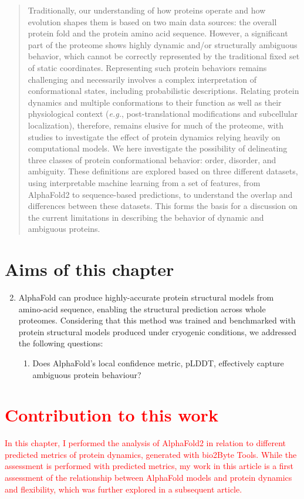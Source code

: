 \begin{abstract}
    Traditionally, our understanding of how proteins operate and how evolution shapes them is based on two main data sources: the overall protein fold and the protein amino acid sequence. However, a significant part of the proteome shows highly dynamic and/or structurally ambiguous behavior, which cannot be correctly represented by the traditional fixed set of static coordinates. Representing such protein behaviors remains challenging and necessarily involves a complex interpretation of conformational states, including probabilistic descriptions. Relating protein dynamics and multiple conformations to their function as well as their physiological context (\textit{e.g.}, post-translational modifications and subcellular localization), therefore, remains elusive for much of the proteome, with studies to investigate the effect of protein dynamics relying heavily on computational models. We here investigate the possibility of delineating three classes of protein conformational behavior: order, disorder, and ambiguity. These definitions are explored based on three different datasets, using interpretable machine learning from a set of features, from AlphaFold2 to sequence-based predictions, to understand the overlap and differences between these datasets. This forms the basis for a discussion on the current limitations in describing the behavior of dynamic and ambiguous proteins.
\end{abstract}

\section*{Aims of this chapter}
\begin{enumerate}
    \setcounter{enumi}{1}
    \item AlphaFold can produce highly-accurate protein structural models from amino-acid sequence, enabling the structural prediction across whole proteomes. Considering that this method was trained and benchmarked with protein structural models produced under cryogenic conditions, we addressed the following questions: 
    \begin{enumerate}
        \item Does AlphaFold's local confidence metric, pLDDT, effectively capture ambiguous protein behaviour?
    \end{enumerate}
\end{enumerate}

\section*{\textcolor{red}{Contribution to this work}}
\textcolor{red}{In this chapter, I performed the analysis of AlphaFold2 in relation to different predicted metrics of protein dynamics, generated with bio2Byte Tools. While the assessment is performed with predicted metrics, my work in this article is a first assessment of the relationship between AlphaFold models and protein dynamics and flexibility, which was further explored in a subsequent article.}



